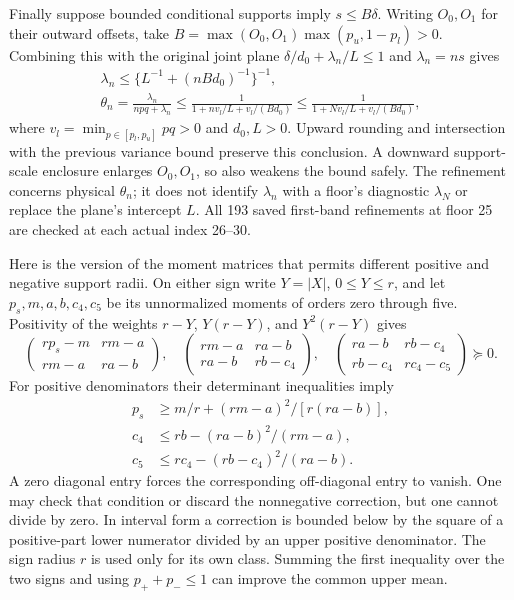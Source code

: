 Finally suppose bounded conditional supports imply $s\le B\delta$.
Writing $O_0,O_1$ for their outward offsets, take
$B=\max(O_0,O_1)\max(p_u,1-p_l)>0$.
Combining this with the original joint
plane $\delta/d_0+\lambda_n/L\le1$ and $\lambda_n=ns$ gives
\begin{gather*}
 \lambda_n\le\{L^{-1}+(nBd_0)^{-1}\}^{-1},\\
 \theta_n=\frac{\lambda_n}{npq+\lambda_n}
 \le\frac1{1+n v_l/L+v_l/(Bd_0)}
 \le\frac1{1+N v_l/L+v_l/(Bd_0)},
\end{gather*}
where $v_l=\min_{p\in[p_l,p_u]}pq>0$ and $d_0,L>0$.
Upward rounding and intersection with the previous variance bound
preserve this conclusion. A downward support-scale enclosure enlarges
$O_0,O_1$, so also weakens the bound safely. The refinement concerns
physical $\theta_n$; it does not identify $\lambda_n$ with a
floor's diagnostic $\lambda_N$ or replace the plane's intercept $L$.
All 193 saved first-band refinements at floor 25 are checked at each
actual index 26--30.


Here is the version of the moment matrices that permits different
positive and negative support radii. On either sign write $Y=|X|$,
$0\le Y\le r$, and let $p_s,m,a,b,c_4,c_5$ be its unnormalized
moments of orders zero through five. Positivity of the weights
$r-Y$, $Y(r-Y)$, and $Y^2(r-Y)$ gives
\[
 \begin{pmatrix}rp_s-m&rm-a\\rm-a&ra-b\end{pmatrix},\quad
 \begin{pmatrix}rm-a&ra-b\\ra-b&rb-c_4\end{pmatrix},\quad
 \begin{pmatrix}ra-b&rb-c_4\\rb-c_4&rc_4-c_5\end{pmatrix}
 \succeq0.
\]
For positive denominators their determinant inequalities imply
\begin{align*}
 p_s&\ge m/r+(rm-a)^2/[r(ra-b)],\\
 c_4&\le rb-(ra-b)^2/(rm-a),\\
 c_5&\le rc_4-(rb-c_4)^2/(ra-b).
\end{align*}
A zero diagonal entry forces the corresponding off-diagonal entry to
vanish. One may check that condition or discard the nonnegative
correction, but one cannot divide by zero. In interval form a correction
is bounded below by the square of a positive-part lower numerator
divided by an upper positive denominator. The sign radius $r$ is used
only for its own class. Summing the first inequality over the two signs
and using $p_++p_-\le1$ can improve the common upper mean.

